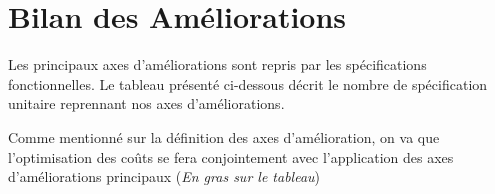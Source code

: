 \section{Bilan des Améliorations}

Les principaux axes d'améliorations sont repris par les spécifications
fonctionnelles.  Le tableau présenté ci-dessous décrit le nombre de
spécification unitaire reprennant nos axes d'améliorations. 

Comme mentionné sur la définition des axes d'amélioration, on va que
l'optimisation des coûts se fera conjointement avec l'application des axes
d'améliorations principaux (\textit{En gras sur le tableau})

